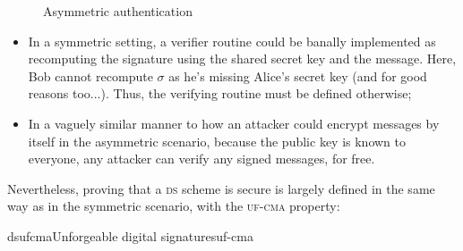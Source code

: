 \begin{figure}
    \centering

    \caption{Asymmetric authentication}
    \label{fig:digisign}
\end{figure}

\begin{itemize}
    \item In a symmetric setting, a verifier routine could be banally implemented as recomputing the signature using the shared secret key and the message. Here, Bob cannot recompute $\sigma$ as he's missing Alice's secret key (and for good reasons too...). Thus, the verifying routine must be defined otherwise;
    \item In a vaguely similar manner to how an attacker could encrypt messages by itself in the asymmetric scenario, because the public key is known to everyone, any attacker can verify any signed messages, for free.
\end{itemize}

Nevertheless, proving that a \textsc{ds} scheme is secure is largely defined in the same way as in the symmetric scenario, with the \textsc{uf-cma} property:

\begin{cryptogame}{dsufcma}{Unforgeable digital signatures}{uf-cma}
    

    \cseqdelay


    \cseqdelay


\end{cryptogame}

